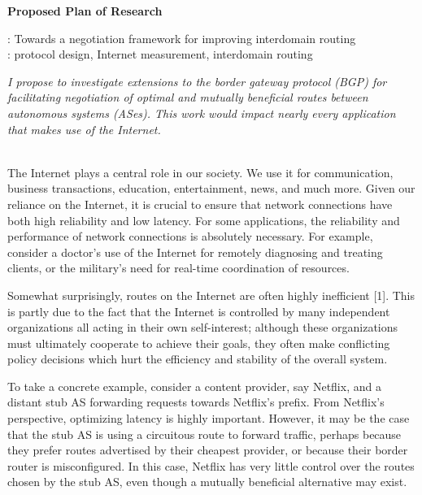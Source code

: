 \documentclass[12pt]{article}	%
\begin{document}
\begin{center}
{\bf Proposed Plan of Research } 
\end{center}

: Towards a negotiation framework for improving interdomain routing  \\
: protocol design, Internet measurement, interdomain routing

{\em I propose to investigate extensions to the border gateway protocol (BGP)
for facilitating negotiation of optimal and mutually beneficial routes between
 autonomous systems (ASes). This work would impact nearly every application that
makes use of the Internet. }

 \\
\indent The Internet plays a central role in our society. We use it for
communication, business transactions, education, entertainment, news, and
much more. Given our reliance on the Internet, it is crucial to ensure that network
connections have both high reliability and low latency. For some
applications, the reliability and performance of network connections is absolutely necessary.
For example, consider a doctor's use of the Internet for remotely diagnosing and
treating clients, or the military's need for real-time coordination of
resources.

Somewhat surprisingly, routes on the Internet are often highly inefficient
[1]. This is partly due to the fact that the Internet is controlled by many
independent organizations all acting in their own self-interest; although
these organizations must ultimately cooperate to achieve their goals, they
often make conflicting policy decisions which hurt the efficiency and
stability of the overall system.

To take a concrete example, consider a content provider, say Netflix, and a
distant stub AS forwarding requests towards Netflix's prefix. From
Netflix's perspective, optimizing latency is highly important. However, it may be the
case that the stub AS is using a circuitous route to forward traffic, perhaps
because they prefer routes advertised by their cheapest provider, or because
their border router is misconfigured. In this case, Netflix has very little control
over the routes chosen by the stub AS, even though a mutually beneficial
alternative may exist.
\end{document}
